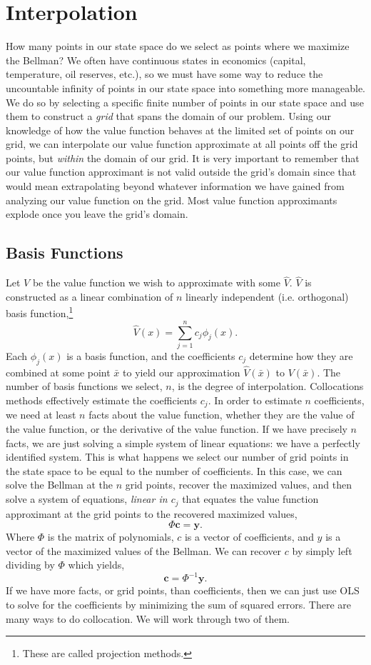 \documentclass[11pt]{article}%
\begin{document}
\section{Interpolation} %
\label{sec:interpolation}
How many points in our state space do we select as points where we maximize the Bellman? We often have continuous states in economics (capital, temperature, oil reserves, etc.), so we must have some way to reduce the uncountable infinity of points in our state space into something more manageable. We do so by selecting a specific finite number of points in our state space and use them to construct a \emph{grid} that spans the domain of our problem. Using our knowledge of how the value function behaves at the limited set of points on our grid, we can interpolate our value function approximate at all points off the grid points, but \emph{within} the domain of our grid. It is very important to remember that our value function approximant is not valid outside the grid's domain since that would mean extrapolating beyond whatever information we have gained from analyzing our value function on the grid. Most value function approximants explode once you leave the grid's domain.

\subsection{Basis Functions}
Let $V$ be the value function we wish to approximate with some $\hat{V}$. $\hat{V}$ is constructed as a linear combination of $n$ linearly independent (i.e. orthogonal) basis function,\footnote{These are called projection methods.}$$
\hat{V}(x)= \sum_{j=1}^n c_j \phi_j(x).$$
Each $\phi_j(x)$ is a basis function, and the coefficients $c_j$ determine how they are combined at some point $\bar{x}$ to yield our approximation $\hat{V}(\bar{x})$ to $V(\bar{x})$. The number of basis functions we select, $n$, is the degree of interpolation. Collocations methods effectively estimate the coefficients $c_j$. In order to estimate $n$ coefficients, we need at least $n$ facts about the value function, whether they are the value of the value function, or the derivative of the value function. If we have precisely $n$ facts, we are just solving a simple system of linear equations: we have a perfectly identified system. This is what happens we select our number of grid points in the state space to be equal to the number of coefficients. In this case, we can solve the Bellman at the $n$ grid points, recover the maximized values, and then solve a system of equations, \emph{linear in $c_j$} that equates the value function approximant at the grid points to the recovered maximized values,$$
\Phi \mathbf{c} = \mathbf{y}.$$
Where $\Phi$ is the matrix of polynomials, $c$ is a vector of coefficients, and $y$ is a vector of the maximized values of the Bellman. We can recover $c$ by simply left dividing by $\Phi$ which yields,$$
\mathbf{c} = \Phi^{-1}\mathbf{y}.$$
If we have more facts, or grid points, than coefficients, then we can just use OLS to solve for the coefficients by minimizing the sum of squared errors. There are many ways to do collocation. We will work through two of them.
\end{document}
